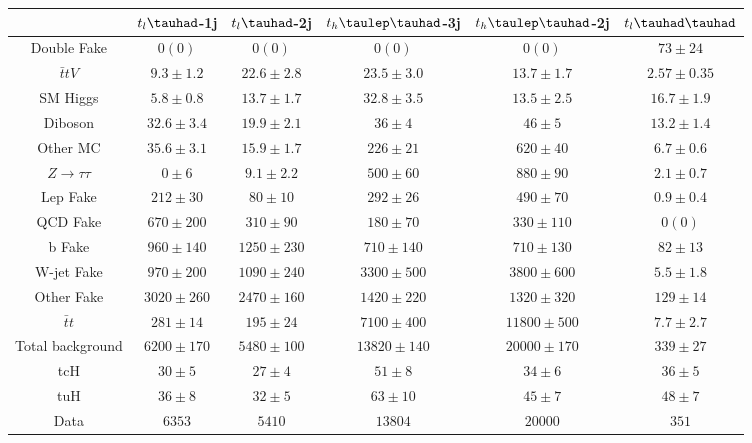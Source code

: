 \begin{table}[htbp]
\begin{tabular}{cccccc} \toprule\toprule
 & $t_l\tauhad$-1j & $t_l\tauhad$-2j & $t_h\tlhad$-3j &$t_h\tlhad$-2j  & $t_l\thadhad$ \\\midrule
  Double Fake            & $0 (0)       $  & $0 (0)       $  & $0 (0)       $  &  $0 (0)       $  & $73 \pm 24    $ \\ 
  $\bar{t}tV$            & $9.3 \pm 1.2 $  & $22.6 \pm 2.8$  & $23.5 \pm 3.0$  &  $13.7 \pm 1.7$  & $2.57 \pm 0.35$ \\ 
  SM Higgs               & $5.8 \pm 0.8 $  & $13.7 \pm 1.7$  & $32.8 \pm 3.5$  &  $13.5 \pm 2.5$  & $16.7 \pm 1.9 $ \\ 
  Diboson                & $32.6 \pm 3.4$  & $19.9 \pm 2.1$  & $36 \pm 4    $  &  $46 \pm 5    $  & $13.2 \pm 1.4 $ \\ 
  Other MC               & $35.6 \pm 3.1$  & $15.9 \pm 1.7$  & $226 \pm 21  $  &  $620 \pm 40  $  & $6.7 \pm 0.6  $  \\ 
  $Z\rightarrow\tau\tau$ & $0 \pm 6     $  & $9.1 \pm 2.2 $  & $500 \pm 60  $  &  $880 \pm 90  $  & $2.1 \pm 0.7  $ \\ 
  Lep Fake               & $212 \pm 30  $  & $80 \pm 10   $  & $292 \pm 26  $  &  $490 \pm 70  $  & $0.9 \pm 0.4  $ \\ 
  QCD Fake               & $670 \pm 200 $  & $310 \pm 90  $  & $180 \pm 70  $  &  $330 \pm 110 $  & $0 (0)        $  \\ 
  b Fake                 & $960 \pm 140 $  & $1250 \pm 230$  & $710 \pm 140 $  &  $710 \pm 130 $  & $82 \pm 13    $ \\ 
  W-jet Fake             & $970 \pm 200 $  & $1090 \pm 240$  & $3300 \pm 500$  &  $3800 \pm 600$  & $5.5 \pm 1.8  $ \\ 
  Other Fake             & $3020 \pm 260$  & $2470 \pm 160$  & $1420 \pm 220$  &  $1320 \pm 320$  & $129 \pm 14   $ \\ 
  $\bar{t}t$             & $281 \pm 14  $  & $195 \pm 24  $  & $7100 \pm 400$  &  $11800 \pm 50$0 & $7.7 \pm 2.7  $ \\ 
  Total background       & $6200 \pm 170$  & $5480 \pm 100$  & $13820 \pm 14$0 &  $20000 \pm 17$0 & $339 \pm 27   $ \\  \midrule
  tcH                    & $30 \pm 5    $  & $27 \pm 4    $  & $51 \pm 8    $  &  $34 \pm 6    $  & $36 \pm 5     $ \\
  tuH                    & $36 \pm 8    $  & $32 \pm 5    $  & $63 \pm 10   $  &  $45 \pm 7    $  & $48 \pm 7     $ \\ \midrule
  Data                   & $6353        $  & $5410        $  & $13804       $  &  $20000       $  & $351          $ \\ 
\bottomrule\bottomrule
\end{tabular}\\




\end{table}

